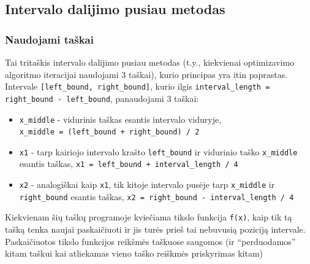 \documentclass[lithuanian,a4paper,12pt]{article}
\newcommand{\mil}{\texttt}
\begin{document}
\subsection{Intervalo dalijimo pusiau metodas}
\subsubsection*{Naudojami taškai}
Tai tritaškis intervalo dalijimo pusiau metodas (t.y., kiekvienai optimizavimo algoritmo iteracijai naudojami 3 taškai), kurio principas yra itin paprastas. 
Intervale \mil{[left_bound, right_bound]}, kurio ilgis \mil{interval_length = right_bound - left_bound}, panaudojami 3 taškai:
\begin{itemize}
    \item \mil{x_middle} - vidurinis taškas esantis intervalo viduryje, \\ \mil{x_middle = (left_bound + right_bound) / 2} 
    \item \mil{x1} - tarp kairiojo intervalo krašto \mil{left_bound} ir vidurinio taško \mil{x_middle} esantis taškas, \mil{x1 = left_bound + interval_length / 4}
    \item \mil{x2} - analogiškai kaip \mil{x1}, tik kitoje intervalo pusėje tarp \mil{x_middle} ir \mil{right_bound} esantis taškas, \mil{x2 = right_bound - interval_length / 4}
\end{itemize}
Kiekvienam šių taškų programoje kviečiama tikslo funkcija \mil{f(x)}, kaip tik tą tašką tenka naujai paskaičiuoti ir jis turės prieš tai nebuvusią poziciją intervale. Paskaičiuotos tikslo funkcijos reikšmės taškuose saugomos (ir ``perduodamos'' kitam taškui kai atliekamas vieno taško reiškmės priskyrimas kitam)

\pagebreak
\end{document}
